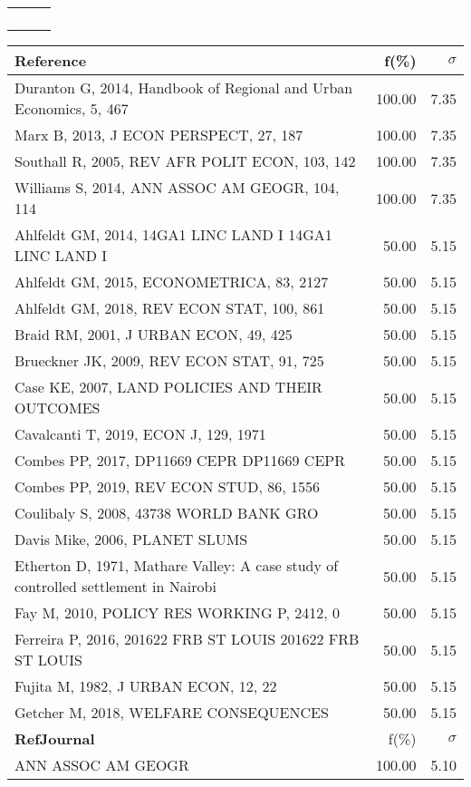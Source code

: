 \documentclass[a4paper,11pt]{report}
\begin{document}
\begin{landscape}
\begin{table}[!ht]
{\begin{tabular}{|p{5cm} r r|}
 &  & \\
 &  & \\
 &  & \\
 &  & \\
\hline
\end{tabular}
}
{\scriptsize\begin{tabular}{|p{8cm} r r|}
\hline
{\bf Reference }& f(\%) & $\sigma$\\
\hline
Duranton G, 2014, Handbook of Regional and Urban Economics, 5, 467 & 100.00 & 7.35\\
Marx B, 2013, J ECON PERSPECT, 27, 187 & 100.00 & 7.35\\
Southall R, 2005, REV AFR POLIT ECON, 103, 142 & 100.00 & 7.35\\
Williams S, 2014, ANN ASSOC AM GEOGR, 104, 114 & 100.00 & 7.35\\
Ahlfeldt GM, 2014, 14GA1 LINC LAND I 14GA1 LINC LAND I & 50.00 & 5.15\\
Ahlfeldt GM, 2015, ECONOMETRICA, 83, 2127 & 50.00 & 5.15\\
Ahlfeldt GM, 2018, REV ECON STAT, 100, 861 & 50.00 & 5.15\\
Braid RM, 2001, J URBAN ECON, 49, 425 & 50.00 & 5.15\\
Brueckner JK, 2009, REV ECON STAT, 91, 725 & 50.00 & 5.15\\
Case KE, 2007, LAND POLICIES AND THEIR OUTCOMES & 50.00 & 5.15\\
Cavalcanti T, 2019, ECON J, 129, 1971 & 50.00 & 5.15\\
Combes PP, 2017, DP11669 CEPR DP11669 CEPR & 50.00 & 5.15\\
Combes PP, 2019, REV ECON STUD, 86, 1556 & 50.00 & 5.15\\
Coulibaly S, 2008, 43738 WORLD BANK GRO & 50.00 & 5.15\\
Davis Mike, 2006, PLANET SLUMS & 50.00 & 5.15\\
Etherton D, 1971, Mathare Valley: A case study of controlled settlement in Nairobi & 50.00 & 5.15\\
Fay M, 2010, POLICY RES WORKING P, 2412, 0 & 50.00 & 5.15\\
Ferreira P, 2016, 201622 FRB ST LOUIS 201622 FRB ST LOUIS & 50.00 & 5.15\\
Fujita M, 1982, J URBAN ECON, 12, 22 & 50.00 & 5.15\\
Getcher M, 2018, WELFARE CONSEQUENCES & 50.00 & 5.15\\
\hline
{\bf RefJournal }& f(\%) & $\sigma$\\
\hline
ANN ASSOC AM GEOGR & 100.00 & 5.10\\

\end{tabular}}
\end{table}
\end{landscape}
\end{document}
